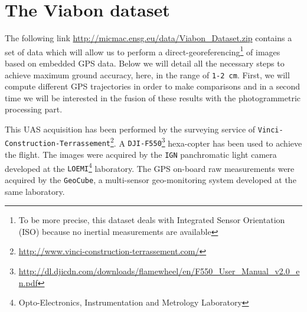  
\section{The Viabon dataset}


The following link \url{http://micmac.ensg.eu/data/Viabon_Dataset.zip} contains a set of data which will allow us to perform a direct-georeferencing\footnote{To be more precise, this dataset deals with Integrated Sensor Orientation (ISO) because no inertial measurements are available} of images based on embedded GPS data. Below we will detail all the necessary steps to achieve maximum ground accuracy, here, in the range of {\tt 1-2 cm}. First, we will compute different GPS trajectories in order to make comparisons and in a second time we will be interested in the fusion of these results with the photogrammetric processing part.\newline

This UAS acquisition has been performed by the surveying service of {\tt Vinci-Construction-Terrassement}\footnote{\url{http://www.vinci-construction-terrassement.com/}}. A {\tt DJI-F550}\footnote{\url{http://dl.djicdn.com/downloads/flamewheel/en/F550_User_Manual_v2.0_en.pdf}} hexa-copter has been used to achieve the flight. The images were acquired by the {\tt IGN} panchromatic light camera developed at the {\tt LOEMI}\footnote{Opto-Electronics, Instrumentation and Metrology Laboratory} laboratory. The GPS on-board raw measurements were acquired by the {\tt GeoCube}, a multi-sensor geo-monitoring system developed at the same laboratory.\newline

